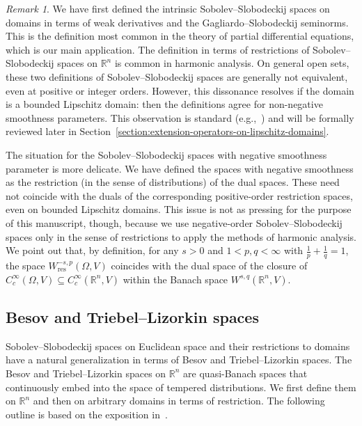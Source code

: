 \documentclass[10pt,a4paper]{amsart}
\theoremstyle{definition}
\theoremstyle{remark}
\newtheorem{remark}[theorem]{Remark}
\numberwithin{equation}{section}
\newcommand{\bbR}{{\mathbb R}}
\newcommand{\Domain}{{\Omega}}
\newcommand{\Wint}{W}
\newcommand{\Wres}{W_{\mathrm{res}}}
\newcommand{\VEC}{{V}}
\begin{document}
\begin{remark}
    We have first defined the intrinsic Sobolev--Slobodeckij spaces on domains in terms of weak derivatives and the Gagliardo--Slobodeckij seminorms. 
    This is the definition most common in the theory of partial differential equations, which is our main application. 
    The definition in terms of restrictions of Sobolev--Slobodeckij spaces on $\bbR^{n}$ is common in harmonic analysis. 
    On general open sets, these two definitions of Sobolev--Slobodeckij spaces are generally not equivalent, even at positive or integer orders.
    However, this dissonance resolves if the domain is a bounded Lipschitz domain:
    then the definitions agree for non-negative smoothness parameters.
    This observation is standard (e.g.,~\cite{grisvard2011elliptic}) and will be formally reviewed later in Section~\ref{section:extension-operators-on-lipschitz-domains}.
    
    The situation for the Sobolev--Slobodeckij spaces with negative smoothness parameter is more delicate. 
    We have defined the spaces with negative smoothness as the restriction (in the sense of distributions) of the dual spaces. 
    These need not coincide with the duals of the corresponding positive-order restriction spaces, even on bounded Lipschitz domains.
    This issue is not as pressing for the purpose of this manuscript, though, 
    because we use negative-order Sobolev--Slobodeckij spaces only in the sense of restrictions to apply the methods of harmonic analysis.
    We point out that, by definition, for any $s > 0$ and $1 < p,q < \infty$ with $\frac{1}{p} + \frac{1}{q} = 1$,
    the space $\Wres^{-s,p}(\Domain,\VEC)$ coincides with the dual space of the closure of $C^{\infty}_{c}(\Domain,\VEC) \subseteq C^{\infty}_{c}(\bbR^{n},\VEC)$ within the Banach space $\Wint^{s,q}(\bbR^{n},\VEC)$. 
\end{remark}



\subsection{Besov and Triebel--Lizorkin spaces}

Sobolev--Slobodeckij spaces on Euclidean space and their restrictions to domains have a natural generalization in terms of Besov and Triebel--Lizorkin spaces.
The Besov and Triebel--Lizorkin spaces on $\bbR^{n}$ are quasi-Banach spaces that continuously embed into the space of tempered distributions.
We first define them on $\bbR^{n}$ and then on arbitrary domains in terms of restriction.
The following outline is based on the exposition in~\cite{mitrea2008poisson}.
\end{document}

